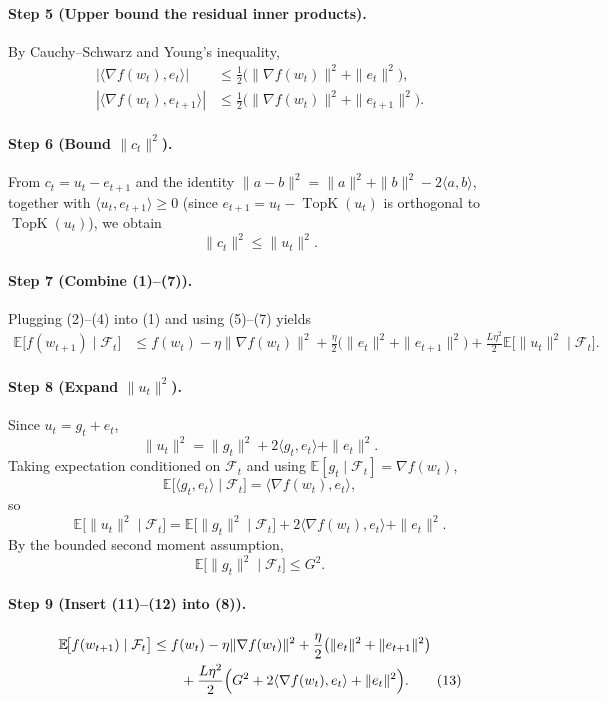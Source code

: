 \documentclass{article}
\newcommand{\E}{\mathbb{E}}
\newcommand{\topK}{\operatorname{TopK}}
\begin{document}
\paragraph{Step 5 (Upper bound the residual inner products).}
By Cauchy–Schwarz and Young’s inequality,
\begin{align}
|\langle\nabla f(w_t),e_t\rangle|
&\le \tfrac12\bigl(\|\nabla f(w_t)\|^{2}+\|e_t\|^{2}\bigr),
\tag{5}\\
|\langle\nabla f(w_t),e_{t+1}\rangle|
&\le \tfrac12\bigl(\|\nabla f(w_t)\|^{2}+\|e_{t+1}\|^{2}\bigr).
\tag{6}
\end{align}
\paragraph{Step 6 (Bound $\|c_t\|^{2}$).}
From $c_t=u_t-e_{t+1}$ and the identity $\|a-b\|^{2}= \|a\|^{2}+\|b\|^{2}-2\langle a,b\rangle$, together with $\langle u_t,e_{t+1}\rangle\ge0$ (since $e_{t+1}=u_t-\topK(u_t)$ is orthogonal to $\topK(u_t)$), we obtain
\[
\|c_t\|^{2}\le\|u_t\|^{2}.
\tag{7}
\]
\paragraph{Step 7 (Combine (1)–(7)).}
Plugging (2)–(4) into (1) and using (5)–(7) yields
\begin{align}
\E\!\bigl[f(w_{t+1})\mid\mathcal{F}_t\bigr]
&\le f(w_t)-\eta\|\nabla f(w_t)\|^{2}
+\frac{\eta}{2}\bigl(\|e_t\|^{2}+\|e_{t+1}\|^{2}\bigr)
+\frac{L\eta^{2}}{2}\E\!\bigl[\|u_t\|^{2}\mid\mathcal{F}_t\bigr].
\tag{8}
\end{align}
\paragraph{Step 8 (Expand $\|u_t\|^{2}$).}
Since $u_t=g_t+e_t$,
\[
\|u_t\|^{2}= \|g_t\|^{2}+2\langle g_t,e_t\rangle+\|e_t\|^{2}.
\tag{9}
\]
Taking expectation conditioned on $\mathcal{F}_t$ and using $\E[g_t\mid\mathcal{F}_t]=\nabla f(w_t)$,
\[
\E\!\bigl[\langle g_t,e_t\rangle\mid\mathcal{F}_t\bigr]
= \langle\nabla f(w_t),e_t\rangle,
\tag{10}
\]
so
\[
\E\!\bigl[\|u_t\|^{2}\mid\mathcal{F}_t\bigr]
= \E\!\bigl[\|g_t\|^{2}\mid\mathcal{F}_t\bigr]
+2\langle\nabla f(w_t),e_t\rangle+\|e_t\|^{2}.
\tag{11}
\]
By the bounded second moment assumption,
\[
\E\!\bigl[\|g_t\|^{2}\mid\mathcal{F}_t\bigr]\le G^{2}.
\tag{12}
\]
\paragraph{Step 9 (Insert (11)–(12) into (8)).}
\begin{align}
\E\!\bigl[f(w_{t+1})\mid\mathcal{F}_t\bigr]
&\le f(w_t)-\eta\|\nabla f(w_t)\|^{2}
+\frac{\eta}{2}\bigl(\|e_t\|^{2}+\|e_{t+1}\|^{2}\bigr) \nonumber\\
&\qquad
+\frac{L\eta^{2}}{2}\Bigl(G^{2}+2\langle\nabla f(w_t),e_t\rangle+\|e_t\|^{2}\Bigr).
\tag{13}
\end{align}
\end{document}
